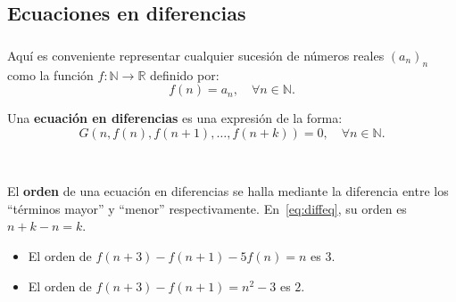 \subsection{Ecuaciones en diferencias}

\begin{frame}
\frametitle{\subsecname}

Aquí es conveniente representar cualquier sucesión de números reales $(a_{n})_{n} $ como la función $f\colon\mathds{N}\rightarrow\mathds{R}$ definido por: \[ f(n)=a_{n},\quad\forall n\in\mathds{N}. \]

\begin{definition}
	Una \textbf{ecuación en diferencias} es una expresión de la forma:
		\begin{equation}\label{eq:diffeq}
			G\left(n,f(n),f\left(n+1\right),\ldots,f\left(n+k\right)\right)=0,\quad\forall n\in\mathds{N}.
		\end{equation}
\end{definition}

\

El \textbf{orden} de una ecuación en diferencias se halla mediante la diferencia entre los ``términos mayor'' y ``menor'' respectivamente. En~\eqref{eq:diffeq}, su orden es \alert{$n+k-n=k$}.%

\begin{example}
	\begin{itemize}
		\item El \alert{orden} de $f\left(n+3\right)-f\left(n+1\right)-5f(n)=n$ es \alert{$3$}.
		\item El \alert{orden} de $f\left(n+3\right)-f\left(n+1\right)=n^{2}-3$ es \alert{$2$}.
	\end{itemize}
\end{example}
\end{frame}

